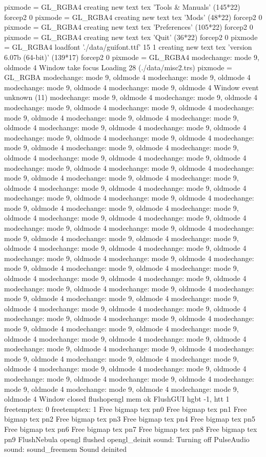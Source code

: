 pixmode = GL_RGBA4
creating new text tex 'Tools & Manuals' (145*22) forcep2 0
pixmode = GL_RGBA4
creating new text tex 'Mods' (48*22) forcep2 0
pixmode = GL_RGBA4
creating new text tex 'Preferences' (105*22) forcep2 0
pixmode = GL_RGBA4
creating new text tex 'Quit' (36*22) forcep2 0
pixmode = GL_RGBA4
loadfont './data/guifont.ttf' 15 1
creating new text tex 'version 6.07b (64-bit)' (139*17) forcep2 0
pixmode = GL_RGBA4
modechange: mode 9, oldmode 4
Window take focus
Loading 28 (./data/misc2.trs)
pixmode = GL_RGBA
modechange: mode 9, oldmode 4
modechange: mode 9, oldmode 4
modechange: mode 9, oldmode 4
modechange: mode 9, oldmode 4
Window event unknown (11)
modechange: mode 9, oldmode 4
modechange: mode 9, oldmode 4
modechange: mode 9, oldmode 4
modechange: mode 9, oldmode 4
modechange: mode 9, oldmode 4
modechange: mode 9, oldmode 4
modechange: mode 9, oldmode 4
modechange: mode 9, oldmode 4
modechange: mode 9, oldmode 4
modechange: mode 9, oldmode 4
modechange: mode 9, oldmode 4
modechange: mode 9, oldmode 4
modechange: mode 9, oldmode 4
modechange: mode 9, oldmode 4
modechange: mode 9, oldmode 4
modechange: mode 9, oldmode 4
modechange: mode 9, oldmode 4
modechange: mode 9, oldmode 4
modechange: mode 9, oldmode 4
modechange: mode 9, oldmode 4
modechange: mode 9, oldmode 4
modechange: mode 9, oldmode 4
modechange: mode 9, oldmode 4
modechange: mode 9, oldmode 4
modechange: mode 9, oldmode 4
modechange: mode 9, oldmode 4
modechange: mode 9, oldmode 4
modechange: mode 9, oldmode 4
modechange: mode 9, oldmode 4
modechange: mode 9, oldmode 4
modechange: mode 9, oldmode 4
modechange: mode 9, oldmode 4
modechange: mode 9, oldmode 4
modechange: mode 9, oldmode 4
modechange: mode 9, oldmode 4
modechange: mode 9, oldmode 4
modechange: mode 9, oldmode 4
modechange: mode 9, oldmode 4
modechange: mode 9, oldmode 4
modechange: mode 9, oldmode 4
modechange: mode 9, oldmode 4
modechange: mode 9, oldmode 4
modechange: mode 9, oldmode 4
modechange: mode 9, oldmode 4
modechange: mode 9, oldmode 4
modechange: mode 9, oldmode 4
modechange: mode 9, oldmode 4
modechange: mode 9, oldmode 4
modechange: mode 9, oldmode 4
modechange: mode 9, oldmode 4
modechange: mode 9, oldmode 4
modechange: mode 9, oldmode 4
modechange: mode 9, oldmode 4
modechange: mode 9, oldmode 4
modechange: mode 9, oldmode 4
modechange: mode 9, oldmode 4
modechange: mode 9, oldmode 4
modechange: mode 9, oldmode 4
modechange: mode 9, oldmode 4
modechange: mode 9, oldmode 4
modechange: mode 9, oldmode 4
modechange: mode 9, oldmode 4
modechange: mode 9, oldmode 4
modechange: mode 9, oldmode 4
modechange: mode 9, oldmode 4
modechange: mode 9, oldmode 4
modechange: mode 9, oldmode 4
modechange: mode 9, oldmode 4
modechange: mode 9, oldmode 4
modechange: mode 9, oldmode 4
Window closed
flushopengl
  mem ok
FlushGUI hgbt -1, htt 1
freetemptex: 0
freetemptex: 1
Free bigmap tex pn0
Free bigmap tex pn1
Free bigmap tex pn2
Free bigmap tex pn3
Free bigmap tex pn4
Free bigmap tex pn5
Free bigmap tex pn6
Free bigmap tex pn7
Free bigmap tex pn8
Free bigmap tex pn9
FlushNebula
  opengl flushed
opengl_deinit
sound: Turning off PulseAudio
sound: sound_freemem
  Sound deinited
